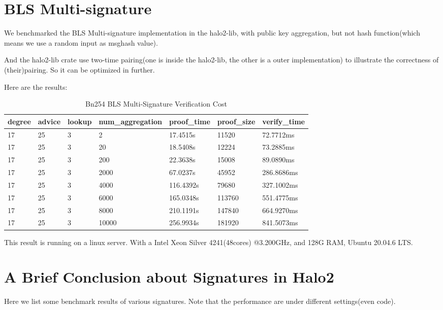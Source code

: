 \documentclass{article}
\begin{document}
\section{BLS Multi-signature}


We benchmarked the BLS Multi-signature implementation in the halo2-lib, with public key aggregation, but not hash function(which means we use a random input as msghash value).

And the halo2-lib crate use two-time pairing(one is inside the halo2-lib, the other is a outer implementation) to illustrate the correctness of (their)pairing. So it can be optimized in further.

Here are the results:
\begin{table}[H]
    \centering
    \begin{tabular}{p{1cm}|p{1cm}|p{1cm}|p{3cm}|p{1.5cm}|p{1.5cm}|p{2cm}} \hline
          degree&advice&lookup&num\_aggregation&proof\_time&proof\_size&verify\_time \\ \hline
17&25&3&2&17.4515s&11520	&72.7712ms \\ \hline
17&25&3&20&18.5408s	&12224&	73.2885ms\\ \hline
17&25&3&200&22.3638s&15008&	89.0890ms\\ \hline
17&25&3&2000&67.0237s&45952	&286.8686ms\\ \hline
17&25&3&4000&116.4392s&79680&327.1002ms\\ \hline
17&25&3&6000&165.0348s&113760&551.4775ms\\ \hline
17&25&3&8000&210.1191s&147840&664.9270ms\\ \hline
17&25&3&10000&256.9934s&181920&841.5073ms\\ \hline
    \end{tabular}
    \caption{Bn254 BLS Multi-Signature Verification Cost}
    \label{tab:my_label}
\end{table}


This result is running on a linux server. With a Intel Xeon Silver 4241(48cores) @3.200GHz, and 128G RAM, Ubuntu 20.04.6 LTS.



\section{A Brief Conclusion about Signatures in Halo2}

Here we list some benchmark results of various signatures. Note that the performance are under different settings(even code).
\end{document}
